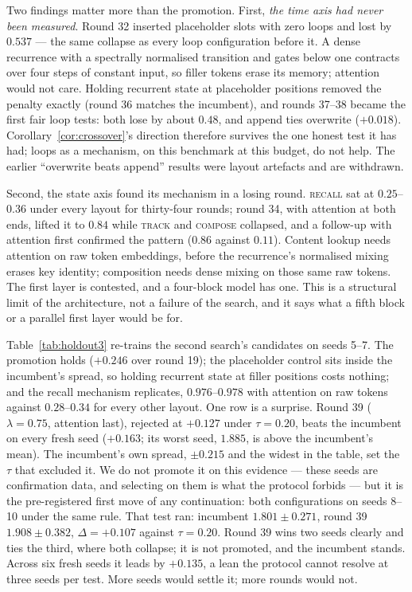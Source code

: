 Two findings matter more than the promotion. First, \emph{the time axis had
never been measured}. Round 32 inserted placeholder slots with zero loops
and lost by $0.537$ --- the same collapse as every loop configuration before
it. A dense recurrence with a spectrally normalised transition and gates
below one contracts over four steps of constant input, so filler tokens erase
its memory; attention would not care. Holding recurrent state at placeholder
positions removed the penalty exactly (round 36 matches the incumbent), and
rounds 37--38 became the first fair loop tests: both lose by about $0.48$, and
append ties overwrite ($+0.018$). Corollary~\ref{cor:crossover}'s direction
therefore survives the one honest test it has had; loops as a mechanism, on
this benchmark at this budget, do not help. The earlier ``overwrite beats
append'' results were layout artefacts and are withdrawn.

Second, the state axis found its mechanism in a losing round. \textsc{recall}
sat at $0.25$--$0.36$ under every layout for thirty-four rounds; round 34,
with attention at both ends, lifted it to $0.84$ while \textsc{track} and
\textsc{compose} collapsed, and a follow-up with attention first confirmed
the pattern ($0.86$ against $0.11$). Content lookup needs attention on raw
token embeddings, before the recurrence's normalised mixing erases key
identity; composition needs dense mixing on those same raw tokens. The first
layer is contested, and a four-block model has one. This is a structural
limit of the architecture, not a failure of the search, and it says what a
fifth block or a parallel first layer would be for.

Table~\ref{tab:holdout3} re-trains the second search's candidates on seeds
5--7. The promotion holds ($+0.246$ over round 19); the placeholder control
sits inside the incumbent's spread, so holding recurrent state at filler
positions costs nothing; and the recall mechanism replicates, $0.976$--$0.978$
with attention on raw tokens against $0.28$--$0.34$ for every other layout.
One row is a surprise. Round 39 ($\lambda = 0.75$, attention last), rejected
at $+0.127$ under $\tau = 0.20$, beats the incumbent on every fresh seed
($+0.163$; its worst seed, $1.885$, is above the incumbent's mean). The
incumbent's own spread, $\pm 0.215$ and the widest in the table, set the
$\tau$ that excluded it. We do not promote it on this evidence --- these
seeds are confirmation data, and selecting on them is what the protocol
forbids --- but it is the pre-registered first move of any continuation:
both configurations on seeds 8--10 under the same rule. That test ran: incumbent $1.801 \pm 0.271$, round 39
$1.908 \pm 0.382$, $\Delta = +0.107$ against $\tau = 0.20$. Round 39 wins two
seeds clearly and ties the third, where both collapse; it is not promoted,
and the incumbent stands. Across six fresh seeds it leads by $+0.135$, a lean
the protocol cannot resolve at three seeds per test. More seeds would settle
it; more rounds would not.

